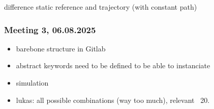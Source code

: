 \documentclass{ltxdockit}
\begin{document}
difference static reference and trajectory (with constant path)

\subsubsection{Meeting 3, 06.08.2025}
\begin{itemize}
  \item barebone structure in Gitlab
  \item abstract keywords need to be defined to be able to instanciate
  \item simulation
  \item lukas: all possible combinations (way too much), relevant ~20. 
\end{itemize}
\end{document}
